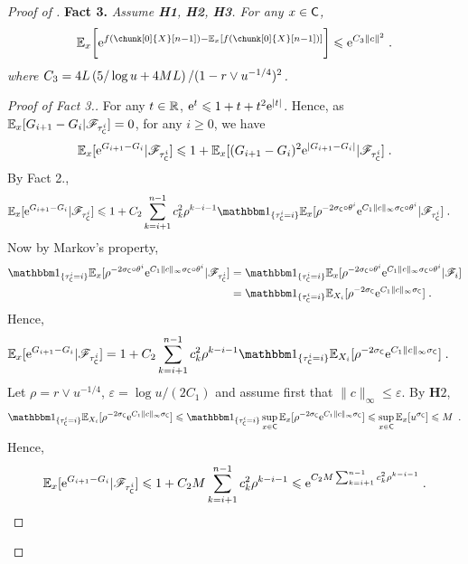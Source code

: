 \documentclass[leqno,11pt,a4paper]{article}
\begin{document}
\begin{proof}[Proof of ]
\noindent
{\bf Fact 3.} \emph{ Assume {\bf H1}, {\bf H2}, {\bf H3}. For any $x\in \mathsf{C}$,}
\begin{align}
\Ebb_x\bigg[\rme^{f(\chunk[0]{X}[n-1])-\Ebb_x[f(\chunk[0]{X}[n-1])]}\bigg]\leqslant \rme^{C_3\|c\|^2}\eqsp.
\end{align}
\emph{where $C_3=4L\left(5 / \log u+4ML\right) / (1-r\vee u^{-1/4})^2$.}
\begin{proof}[Proof of Fact 3.]
For any $t\in \mathbb{R}$, $\mathrm{e}^t\leqslant 1+t+t^2\mathrm{e}^{|t|}$. Hence, as $\mathbb{E}_{x}[G_{i+1}-G_i|\mathscr{F}_{\tau_{\mathsf{C}}^{i}}]=0$, for any $i\geqslant 0$, we have
\begin{align*}
 \mathbb{E}_x[\mathrm{e}^{G_{i+1}-G_i}|\mathscr{F}_{\tau_{\mathsf{C}}^{i}}]\leqslant 1+\mathbb{E}_x[(G_{i+1}-G_i)^2\mathrm{e}^{|G_{i+1}-G_i|}|\mathscr{F}_{\tau_{\mathsf{C}}^{i}}]\;.
\end{align*}
By Fact 2.,
\begin{align*}
 \Ebb_x[\rme^{G_{i+1}-G_i}|\cF_{\tau_{\cC}^{i}}]&\leqslant 1+C_2\sum_{k=i+1}^{n-1}c_k^2\rho^{k-i-1}\indiacc{\tau_{\cC}^{i}=i}\Ebb_x[\rho^{-2\sigma_{\cC}\circ\theta^{i}}\rme^{C_1\|c\|_{\infty}\sigma_{\cC}\circ\theta^{i}}|\cF_{\tau_{\cC}^{i}}]\eqsp.
 \end{align*}
 Now by Markov's property,
\begin{align*}
\indiacc{\tau_{\cC}^{i}=i} \Ebb_x[\rho^{-2\sigma_{\cC}\circ\theta^{i}}\rme^{C_1\|c\|_{\infty}\sigma_{\cC}\circ\theta^{i}}|\cF_{\tau_{\cC}^{i}}]&=\indiacc{\tau_{\cC}^{i}=i} \Ebb_x[\rho^{-2\sigma_{\cC}\circ\theta^{i}}\rme^{C_1\|c\|_{\infty}\sigma_{\cC}\circ\theta^{i}}|\cF_{i}]\\
&=\indiacc{\tau_{\cC}^{i}=i}\Ebb_{X_i}[\rho^{-2\sigma_{\cC}}\rme^{C_1\|c\|_{\infty}\sigma_{\cC}}]\eqsp.
\end{align*}
Hence,
 \begin{align*}
 \Ebb_x[\rme^{G_{i+1}-G_i}|\cF_{\tau_{\cC}^{i}}]
 &=1+C_2\sum_{k=i+1}^{n-1}c_k^2\rho^{k-i-1}\indiacc{\tau_{\cC}^{i}=i}\Ebb_{X_i}[\rho^{-2\sigma_{\cC}}\rme^{C_1\|c\|_{\infty}\sigma_{\cC}}]\eqsp.
 \end{align*}
Let $\rho=r\vee u^{-1/4}$, $\varepsilon=\log u/(2C_1)$ and assume first that $\|c\|_{\infty}\leqslant \varepsilon$. By {\bf H$2$},
\[
\indiacc{\tau_{\cC}^{i}=i}\Ebb_{X_i}[\rho^{-2\sigma_{\cC}}\rme^{C_1\|c\|_{\infty}\sigma_{\cC}}]\leqslant \indiacc{\tau_{\cC}^{i}=i}\sup_{x\in\cC}\Ebb_x[\rho^{-2\sigma_{\cC}}\rme^{C_1\|c\|_{\infty}\sigma_{\cC}}]\leqslant\sup_{x\in\cC}\Ebb_x[u^{\sigma_{\cC}}]\leqslant M\enspace.
\]
Hence,
\[
 \mathbb{E}_x[\mathrm{e}^{G_{i+1}-G_i}|\mathscr{F}_{\tau_{\mathsf{C}}^{i}}]\leqslant 1+C_2M\sum_{k=i+1}^{n-1}c_k^2\rho^{k-i-1}\leqslant \mathrm{e}^{C_2M\sum_{k=i+1}^{n-1}c_k^2\rho^{k-i-1}}\;.
\]
\end{proof}
\end{proof}
\end{document}
